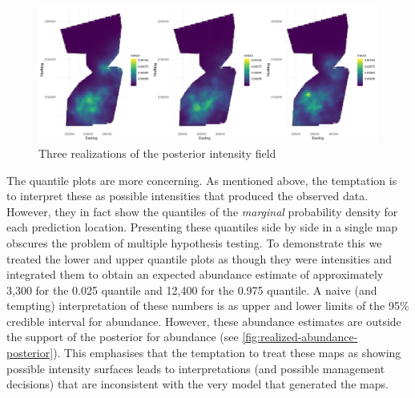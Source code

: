 \documentclass[preprint,12pt]{elsarticle}
\begin{document}
\begin{figure}
	\includegraphics[scale=0.35]{figures/intensity_realized.png}
	\caption{Three realizations of the posterior intensity field}
	\label{fig:intensity-realizations}
\end{figure}

The quantile plots are more concerning.  As mentioned above, the temptation is to interpret these as possible intensities that produced the observed data.  However, they in fact show the quantiles of the \textit{marginal} probability density for each prediction location. Presenting these quantiles side by side in a single map obscures the problem of multiple hypothesis testing.  To demonstrate this we treated the lower and upper quantile plots as though they were intensities and integrated them to obtain an expected abundance estimate of approximately 3,300 for the 0.025 quantile and 12,400 for the 0.975 quantile.  A naive (and tempting) interpretation of these numbers is as upper and lower limits of the 95\% credible interval for abundance. However, these abundance estimates are outside the support of the posterior for abundance (see \autoref{fig:realized-abundance-posterior}).  This emphasises that the temptation to treat these maps as showing possible intensity surfaces leads to interpretations (and possible management decisions) that are inconsistent with the very model that generated the maps.
\end{document}
